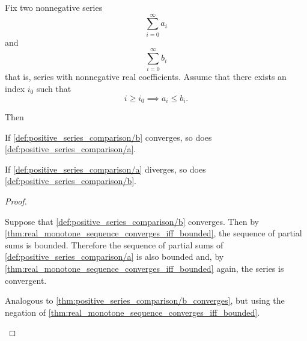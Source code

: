 \begin{proposition}\label{thm:positive_series_comparison}\cite[]{Фихтенгольц1968}
  Fix two nonnegative series
  \begin{equation}\label{def:positive_series_comparison/a}
    \sum_{i=0}^\infty a_i
  \end{equation}
  and
  \begin{equation}\label{def:positive_series_comparison/b}
    \sum_{i=0}^\infty b_i
  \end{equation}
  that is, series with nonnegative real coefficients. Assume that there exists an index \( i_0 \) such that
  \begin{equation*}
    i \geq i_0 \implies a_i \leq b_i.
  \end{equation*}

  Then
  \begin{thmenum}
     If \cref{def:positive_series_comparison/b} converges, so does \cref{def:positive_series_comparison/a}.

     If \cref{def:positive_series_comparison/a} diverges, so does \cref{def:positive_series_comparison/b}.
  \end{thmenum}
\end{proposition}
\begin{proof}
  \begin{description}
     Suppose that \cref{def:positive_series_comparison/b} converges. Then by \cref{thm:real_monotone_sequence_converges_iff_bounded}, the sequence of partial sums is bounded. Therefore the sequence of partial sums of \cref{def:positive_series_comparison/a} is also bounded and, by \cref{thm:real_monotone_sequence_converges_iff_bounded} again, the series is convergent.

     Analogous to \cref{thm:positive_series_comparison/b_converges}, but using the negation of \cref{thm:real_monotone_sequence_converges_iff_bounded}.
  \end{description}
\end{proof}

